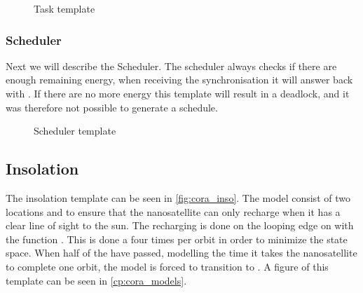 \begin{figure}[h]
	\caption{Task template}
	\label{fig:cora_pro}
\end{figure}



\subsubsection*{Scheduler}
Next we will describe the Scheduler. The scheduler always checks if there are enough remaining energy, when receiving the synchronisation  it will answer back with . If there are no more energy this template will result in a deadlock, and it was therefore not possible to generate a schedule.

\begin{figure}[H]
	\centering
	\caption{Scheduler template}
	\label{fig:cora_schedule}
\end{figure}


\subsection*{Insolation} 
The insolation template can be seen in \cref{fig:cora_inso}. The model consist of two locations  and  to ensure that the nanosatellite can only recharge when it has a clear line of sight to the sun. The recharging is done on the looping edge on  with the function . This is done a four times per orbit in order to minimize the state space. When half of the  have passed, modelling the time it takes the nanosatellite to complete one orbit, the model is forced to transition to .
A figure of this template can be seen in \cref{cp:cora_models}.

